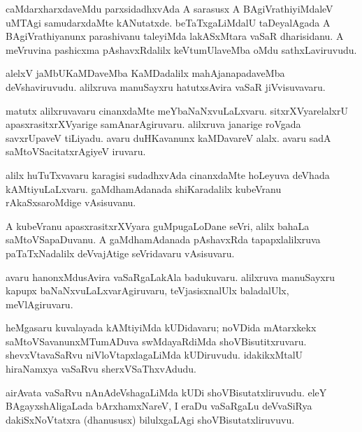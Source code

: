 \documentclass{article}
\begin{document}
\begin{mn}
caMdarxharxdaveMdu parxsidadhxvAda A sarasusx A BAgiVrathiyiMdaleV uMTAgi
samudarxdaMte kANutatxde. beTaTxgaLiMdalU taDeyalAgada A BAgiVrathiyanunx 
parashivanu taleyiMda lakASxMtara vaSaR dharisidanu. A meVruvina pashicxma 
pAshavxRdalilx keVtumUlaveMba oMdu sathxLaviruvudu.
\end{mn}

\begin{mn}
alelxV jaMbUKaMDaveMba KaMDadalilx mahAjanapadaveMba deVshaviruvudu. 
alilxruva manuSayxru hatutxsAvira vaSaR jiVvisuvavaru.
\end{mn}

\begin{mn}
matutx alilxruvavaru cinanxdaMte meYbaNaNxvuLaLxvaru.
sitxrXVyarelalxrU apasxrasitxrXVyarige samAnarAgiruvaru. alilxruva janarige
roVgada savxrUpaveV tiLiyadu. avaru duHKavanunx kaMDavareV alalx. 
avaru sadA saMtoVSacitatxrAgiyeV iruvaru.
\end{mn}

\begin{mn}
alilx huTuTxvavaru karagisi sudadhxvAda cinanxdaMte hoLeyuva deVhada 
kAMtiyuLaLxvaru. gaMdhamAdanada shiKaradalilx kubeVranu rAkaSxsaroMdige vAsisuvanu.
\end{mn}

\begin{mn}
A kubeVranu apasxrasitxrXVyara guMpugaLoDane seVri, alilx bahaLa saMtoVSapaDuvanu. 
A gaMdhamAdanada pAshavxRda tapapxlalilxruva paTaTxNadalilx 
deVvajAtige seVridavaru vAsisuvaru.
\end{mn}

\begin{mn}
avaru hanonxMdusAvira vaSaRgaLakAla badukuvaru.
alilxruva manuSayxru kapupx baNaNxvuLaLxvarAgiruvaru, 
teVjasisxnalUlx baladalUlx, meVlAgiruvaru.
\end{mn}

\begin{mn}
heMgasaru kuvalayada kAMtiyiMda kUDidavaru; noVDida mAtarxkekx 
saMtoVSavanunxMTumADuva swMdayaRdiMda shoVBisutitxruvaru. 
shevxVtavaSaRvu niVloVtapxlagaLiMda kUDiruvudu. 
idakikxMtalU hiraNamxya vaSaRvu sherxVSaThxvAdudu.
\end{mn}

\begin{mn}
airAvata vaSaRvu nAnAdeVshagaLiMda kUDi shoVBisutatxliruvudu. 
eleY BAgayxshAligaLada bArxhamxNareV, I eraDu vaSaRgaLu deVvaSiRya dakiSxNoVtatxra 
(dhanususx) bilulxgaLAgi shoVBisutatxliruvuvu.
\end{mn}
\end{document}
